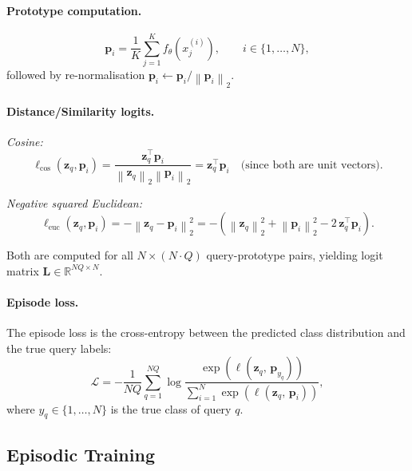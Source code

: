 \documentclass[11pt,a4paper]{article}
\newcommand{\R}{\mathbb{R}}
\newcommand{\norm}[1]{\left\| #1 \right\|}
\newcommand{\vect}[1]{\mathbf{#1}}
\newcommand{\mat}[1]{\mathbf{#1}}
\newcommand{\encoder}{f_\theta}
\begin{document}
\paragraph{Prototype computation.}
\begin{equation}
  \label{eq:prototype}
  \vect{p}_i = \frac{1}{K} \sum_{j=1}^K \encoder(x_j^{(i)}), \qquad i \in \{1,\ldots,N\},
\end{equation}
followed by re-normalisation $\vect{p}_i \leftarrow \vect{p}_i / \norm{\vect{p}_i}_2$.

\paragraph{Distance/Similarity logits.}

\emph{Cosine:}
\begin{equation}
  \label{eq:cosine}
  \ell_{\mathrm{cos}}(\vect{z}_q, \vect{p}_i)
  = \frac{\vect{z}_q^\top \vect{p}_i}{\norm{\vect{z}_q}_2 \norm{\vect{p}_i}_2}
  = \vect{z}_q^\top \vect{p}_i
  \quad\text{(since both are unit vectors)}.
\end{equation}

\emph{Negative squared Euclidean:}
\begin{equation}
  \label{eq:euclidean}
  \ell_{\mathrm{euc}}(\vect{z}_q, \vect{p}_i)
  = -\norm{\vect{z}_q - \vect{p}_i}_2^2
  = -\left(\norm{\vect{z}_q}_2^2 + \norm{\vect{p}_i}_2^2 - 2\,\vect{z}_q^\top \vect{p}_i\right).
\end{equation}

Both are computed for all $N \times (N \cdot Q)$ query-prototype pairs, yielding
logit matrix $\mat{L} \in \R^{NQ \times N}$.

\paragraph{Episode loss.}
The episode loss is the cross-entropy between the predicted class distribution
and the true query labels:
\begin{equation}
  \label{eq:loss}
  \mathcal{L} = -\frac{1}{NQ} \sum_{q=1}^{NQ} \log
  \frac{\exp\!\left(\ell(\vect{z}_{q},\, \vect{p}_{y_q})\right)}
       {\sum_{i=1}^{N} \exp\!\left(\ell(\vect{z}_{q},\, \vect{p}_i)\right)},
\end{equation}
where $y_q \in \{1,\ldots,N\}$ is the true class of query $q$.

\subsection{Episodic Training}
\end{document}
